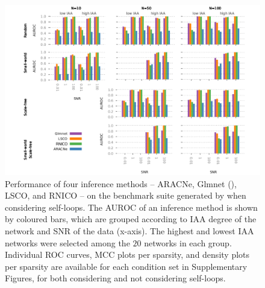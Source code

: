 \begin{figure}[!htb]
\centering
\includegraphics[width=1\linewidth]{img/110117_hasDiag_data_performance}
\captionsetup{width=.7\textwidth}
\caption{Performance of four inference methods -- ARACNe, Glmnet (\lasso), LSCO, and RNICO -- on the benchmark suite  generated by \gs when considering self-loops. The AUROC of an inference method is shown by coloured bars, which are grouped according to IAA degree of the network and SNR of the data (x-axis). The highest and lowest IAA networks were selected among the $20$ networks in each group. Individual ROC curves, MCC plots per sparsity, and density plots per sparsity are available for each condition set in Supplementary Figures, for both considering and not considering self-loops.}
\label{fig:performance}
\end{figure}

